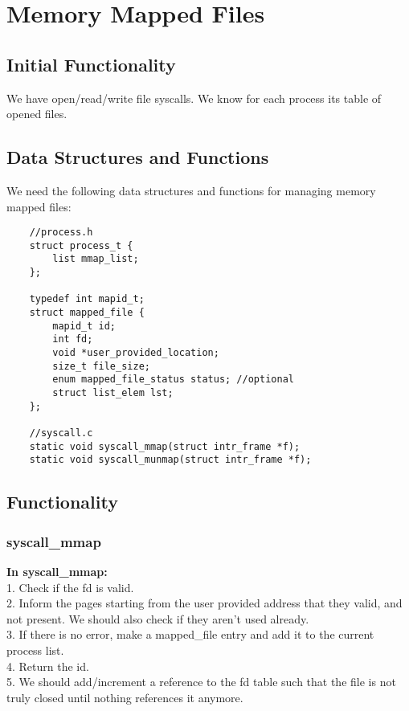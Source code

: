 \section{Memory Mapped Files}
\subsection{Initial Functionality}

We have open/read/write file syscalls. We know for each process its table of opened files.


\subsection{Data Structures and Functions}

We need the following data structures and functions for managing memory mapped files: 

\begin{lstlisting}
	//process.h
	struct process_t {
		list mmap_list;
	};

	typedef int mapid_t;
	struct mapped_file {
		mapid_t id;
		int fd;
		void *user_provided_location;
		size_t file_size;
		enum mapped_file_status status; //optional
		struct list_elem lst;
	};

	//syscall.c
	static void syscall_mmap(struct intr_frame *f);
	static void syscall_munmap(struct intr_frame *f);
\end{lstlisting}
	


\subsection{Functionality}

\subsubsection{ syscall\_mmap }
\textbf{In syscall\_mmap:}
	\\1. Check if the fd is valid.
	\\2. Inform the pages starting from the user provided address that they valid, and not present. We should also check if they aren't used already.
	\\3. If there is no error, make a mapped\_file entry and add it to the current process list.
	\\4. Return the id.
	\\5. We should add/increment a reference to the fd table such that the file is not truly closed until nothing references it anymore.



